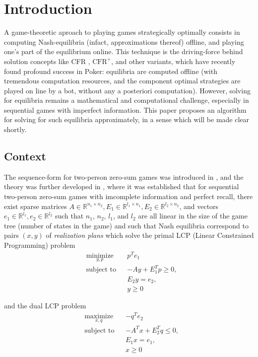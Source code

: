 \documentclass{article} %
\begin{document}
\section{Introduction}
\label{sec:intro}
A game-theoretic aproach to playing games strategically optimally consists in computing Nash-equilibria (infact, approximations thereof) offline, and playing one's part of the equilibrium online. This technique is the driving-force behind solution concepts like CFR \cite{lanctot2009monte}, $\text{CFR}^{+}$, and other variants, which have recently found profound success in Poker: equilibria are computed offline (with tremendous computation resources, and the component optimal strategies are played on line by a bot, without any a posteriori computation). However, solving for equilibria remains a mathematical and computational challenge, especially in sequential games with imperfect information. This paper proposes an algorithm for solving for such equilibria approximately, in a sense which will be made clear shortly.

\subsection{Context}
The sequence-form for two-person zero-sum games was introduced in \cite{koller1992complexity}, and the theory was further developed in \cite{von1996efficient, vonequilibrium}, where it was established that for sequential two-person zero-sum games with imcomplete information and perfect recall, there exist sparse matrices $A \in \mathbb{R}^{n_1 \times n_2}, E_1 \in \mathbb{R}^{l_1 \times n_1}, E_2 \in \mathbb{R}^{l_2 \times n_2}$, and vectors $e_1 \in \mathbb{R}^{l_1}, e_2 \in \mathbb{R}^{l_2}$ such that $n_1$, $n_2$, $l_1$, and $l_2$ are all linear in the size of the game tree (number of states in the game) and such that Nash equilibria correspond to pairs $(x, y)$ of \textit{realization plans} which solve the primal LCP (Linear Constrained Programming) problem
\begin{equation}
  \begin{aligned}
    & \underset{y,p}{\text{minimize}}
    & & p^Te_1 \\
    & \text{subject to}
    & & -Ay + E_1^Tp \geq 0,\\
    &&& E_2y = e_2,\\
    &&& y \ge 0
  \end{aligned}
  \label{eq:primal_pb}
\end{equation}

and the dual LCP problem
\begin{equation}
  \begin{aligned}
    & \underset{x,q}{\text{maximize}}
    & & -q^Te_2 \\
    & \text{subject to}
    & & -A^Tx + E_2^Tq \leq 0,\\
    &&& E_1x = e_1,\\
    &&& x \ge 0
  \end{aligned}
  \label{eq:dual_pb}
\end{equation}
\end{document}
